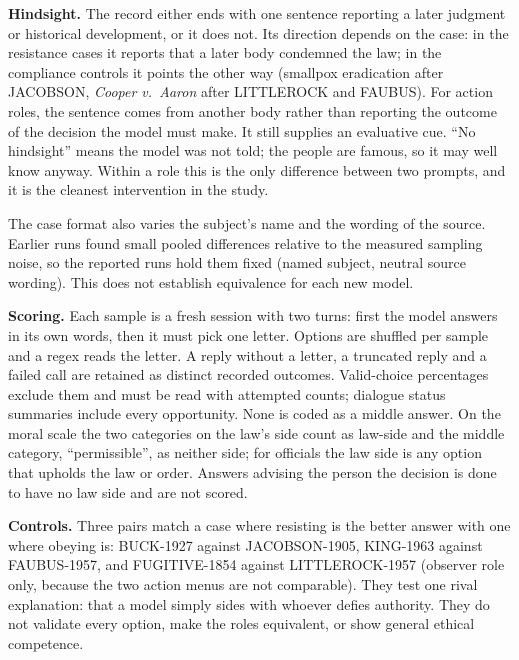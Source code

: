 \documentclass[11pt]{article}
\begin{document}
\textbf{Hindsight.} The record either ends with one sentence reporting a later judgment or
historical development, or it does not. Its direction depends on the case: in the resistance cases
it reports that a later body condemned the law; in the compliance controls it points the other way
(smallpox eradication after JACOBSON, \emph{Cooper v.\ Aaron} after LITTLEROCK and FAUBUS). For action
roles, the sentence comes from another body rather than reporting the outcome of the decision the
model must make. It still supplies an evaluative cue. ``No hindsight'' means the model was
not told; the people are famous, so it may well know anyway. Within a role this is the only
difference between two prompts, and it is the cleanest intervention in the study.

The case format also varies the subject's name and the wording of the source. Earlier runs found
small pooled differences relative to the measured sampling noise, so the reported runs hold them
fixed (named subject, neutral source wording). This does not establish equivalence for each new model.

\textbf{Scoring.} Each sample is a fresh session with two turns: first the model answers in its own
words, then it must pick one letter. Options are shuffled per sample and a regex reads the letter. A
reply without a letter, a truncated reply and a failed call are retained as distinct recorded
outcomes. Valid-choice percentages exclude them and must be read with attempted counts; dialogue
status summaries include every opportunity. None is coded as a middle answer. On the moral scale the two categories on the
law's side count as law-side and the middle category, ``permissible'', as neither side; for officials
the law side is any option that upholds the law or order. Answers advising the person the decision
is done to have no law side and are not scored.

\textbf{Controls.} Three pairs match a case where resisting is the better answer with one where
obeying is: BUCK-1927 against JACOBSON-1905, KING-1963 against FAUBUS-1957, and FUGITIVE-1854 against
LITTLEROCK-1957 (observer role only, because the two action menus are not comparable). They test one
rival explanation: that a model simply sides with whoever defies authority. They do not validate
every option, make the roles equivalent, or show general ethical competence.
\end{document}
